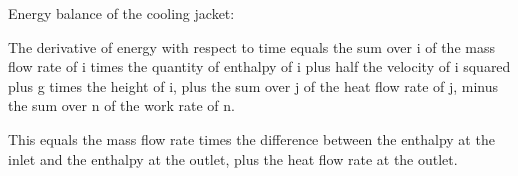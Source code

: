 Energy balance of the cooling jacket:

The derivative of energy with respect to time equals the sum over i of the mass flow rate of i times the quantity of enthalpy of i plus half the velocity of i squared plus g times the height of i, plus the sum over j of the heat flow rate of j, minus the sum over n of the work rate of n.

This equals the mass flow rate times the difference between the enthalpy at the inlet and the enthalpy at the outlet, plus the heat flow rate at the outlet.